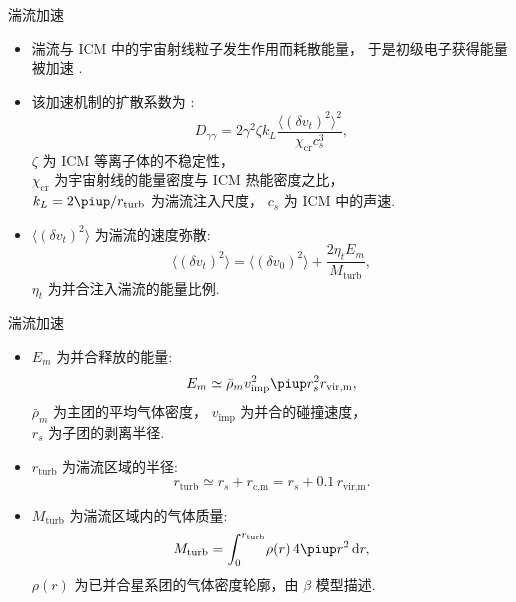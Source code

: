 \documentclass{beamer}
\newcommand{\R}[1]{\text{#1}}  %
\newcommand{\Cpi}{\piup}  %
\newcommand{\D}[1]{\R{d}#1}
\begin{document}
\begin{frame}
  \begin{alertblock}{湍流加速}
    \smallskip
    \begin{itemize}
      \item 湍流与 ICM 中的宇宙射线粒子发生作用而耗散能量，
        于是初级电子获得能量被加速 \cite{brunetti2011}.
      \item 该加速机制的扩散系数为 \cite{miniati2015}:
        \begin{equation}
          D_{\gamma\gamma} =
            2 \gamma^2 \zeta k_L
            \frac{\langle (\delta v_t)^2 \rangle^2}{\chi_{\R{cr}} c_s^3} ,
        \end{equation}
        $\zeta$ 为 ICM 等离子体的不稳定性，\\
        $\chi_{\R{cr}}$ 为宇宙射线的能量密度与 ICM 热能密度之比，\\
        $k_L = 2\Cpi / r_{\R{turb}}$ 为湍流注入尺度，
        $c_s$ 为 ICM 中的声速.
      \item $\langle (\delta v_t)^2 \rangle$ 为湍流的速度弥散:
        \begin{equation}
          \langle (\delta v_t)^2 \rangle =
            \langle (\delta v_0)^2 \rangle +
            \frac{2 \eta_t E_m}{M_{\R{turb}}} ,
        \end{equation}
        $\eta_t$ 为并合注入湍流的能量比例.
    \end{itemize}
  \end{alertblock}
\end{frame}

\begin{frame}
  \begin{alertblock}{湍流加速}
    \smallskip
    \begin{itemize}
      \item $E_m$ 为并合释放的能量:
        \begin{equation}
          E_m \simeq \bar{\rho}_m v_{\R{imp}}^2
            \Cpi r_s^2 r_{\R{vir,m}} ,
        \end{equation}
        $\bar{\rho}_m$ 为主团的平均气体密度，
        $v_{\R{imp}}$ 为并合的碰撞速度，\\
        $r_s$ 为子团的剥离半径.
      \item $r_{\R{turb}}$ 为湍流区域的半径:
        \begin{equation}
          r_{\R{turb}} \simeq r_s + r_{\R{c,m}}
            = r_s + 0.1\,r_{\R{vir,m}} .
        \end{equation}
      \item $M_{\R{turb}}$ 为湍流区域内的气体质量:
        \begin{equation}
          M_{\R{turb}} =
            \int_0^{r_{\R{turb}}} \! \rho(r) \,4\Cpi r^2 \,\D{r} ,
        \end{equation}
        $\rho(r)$ 为已并合星系团的气体密度轮廓，由 $\beta$ 模型描述.
    \end{itemize}
  \end{alertblock}
\end{frame}
\end{document}
